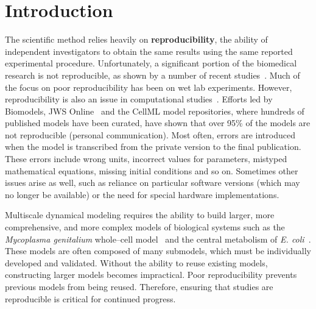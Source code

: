 \documentclass[10pt,letterpaper]{article}
\begin{document}
\linenumbers

\section*{Introduction}

The scientific method relies heavily on {\bf reproducibility}, the ability of independent investigators to obtain the same results using the same reported experimental procedure.  Unfortunately, a significant portion of the biomedical research is not reproducible, as shown by a number of recent studies~\cite{prinz2011believe,mobley2013survey}.
Much of the focus on poor reproducibility has been on wet lab experiments. However, reproducibility is also an issue in computational studies~\cite{peng2016moving,medley2016guidelines,mcdougal2016reproducibility,waltemath2016modeling}.  Efforts led by Biomodels, JWS Online~\cite{olivier2004web} and the CellML model repositories, where hundreds of published models have been curated, have shown that over 95\% of the models are not reproducible (personal communication). Most often, errors are introduced when the model is transcribed from the private version to the final publication.  These errors include wrong units, incorrect values for parameters, mistyped mathematical equations, missing initial conditions and so on. Sometimes other issues arise as well, such as reliance on particular software versions (which may no longer be available) or the need for special hardware implementations.

Multiscale dynamical modeling requires the ability to build larger, more comprehensive, and more complex models of biological systems such as the \textit{Mycoplasma genitalium} whole--cell model~\cite{karr2012whole} and the central metabolism of \textit{E. coli}~\cite{millard2017metabolic}. These models are often composed of many submodels, which must be individually developed and validated. Without the ability to reuse existing models, constructing larger models becomes impractical. Poor reproducibility prevents previous models from being reused. Therefore, ensuring that studies are reproducible is critical for continued progress.
\end{document}
